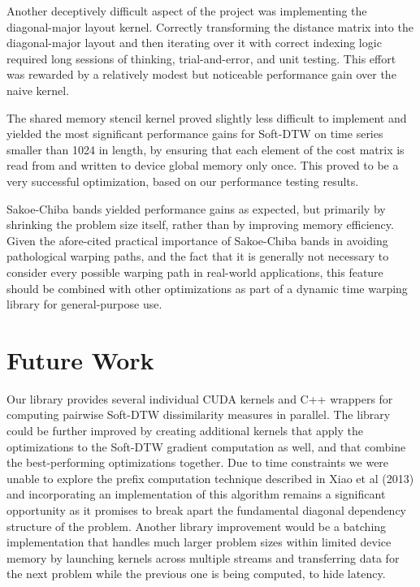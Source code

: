 \documentclass[12pt, letterpaper]{article}
\begin{document}
Another deceptively difficult aspect of the project was implementing the
diagonal-major layout kernel. Correctly transforming the distance matrix into
the diagonal-major layout and then iterating over it with correct indexing logic
required long sessions of thinking, trial-and-error, and unit testing. This
effort was rewarded by a relatively modest but noticeable performance gain over
the naive kernel.

The shared memory stencil kernel proved slightly less difficult to implement and
yielded the most significant performance gains for Soft-DTW on time series
smaller than 1024 in length, by ensuring that each element of the cost matrix is
read from and written to device global memory only once. This proved to be a
very successful optimization, based on our performance testing results.

Sakoe-Chiba bands yielded performance gains as expected, but primarily by
shrinking the problem size itself, rather than by improving memory efficiency.
Given the afore-cited practical importance of Sakoe-Chiba bands in avoiding
pathological warping paths, and the fact that it is generally not necessary to
consider every possible warping path in real-world applications, this feature
should be combined with other optimizations as part of a dynamic time warping
library for general-purpose use.

\section{Future Work}

Our library provides several individual CUDA kernels and C++ wrappers for
computing pairwise Soft-DTW dissimilarity measures in parallel. The library
could be further improved by creating additional kernels that apply the
optimizations to the Soft-DTW gradient computation as well, and that combine the
best-performing optimizations together. Due to time constraints we were unable
to explore the prefix computation technique described in Xiao et al (2013)
\cite{xiao_parallelizing_2013} and incorporating an implementation of this
algorithm remains a significant opportunity as it promises to break apart the
fundamental diagonal dependency structure of the problem. Another library
improvement would be a batching implementation that handles much larger problem
sizes within limited device memory by launching kernels across multiple streams
and transferring data for the next problem while the previous one is being
computed, to hide latency.
\end{document}

